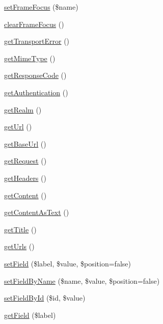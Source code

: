 \begin{DoxyCompactItemize}
\item 
\hyperlink{class_simple_browser_ab7d90a4fb628f576addbec39d1ba26a7}{setFrameFocus} (\$name)
\item 
\hyperlink{class_simple_browser_afe31f064242f5fcc4d00f73088ea6a91}{clearFrameFocus} ()
\item 
\hyperlink{class_simple_browser_aa2141efbbde157cd02e747a149c729db}{getTransportError} ()
\item 
\hyperlink{class_simple_browser_a39e85378a12be207e0b97fd702d9447d}{getMimeType} ()
\item 
\hyperlink{class_simple_browser_acad2d21725cfa0c655104f8e83564c43}{getResponseCode} ()
\item 
\hyperlink{class_simple_browser_a64b60f41bbd36857d8157c30314344fd}{getAuthentication} ()
\item 
\hyperlink{class_simple_browser_a4183d97a5f3b05566c8cad395881c413}{getRealm} ()
\item 
\hyperlink{class_simple_browser_a92cdd5a8dc1a7b29ca064bb3f29ad63d}{getUrl} ()
\item 
\hyperlink{class_simple_browser_ade478f581d42d5c7fafbc62015a8c5b2}{getBaseUrl} ()
\item 
\hyperlink{class_simple_browser_a51cfc002c152bf6d83311b361a5ca10e}{getRequest} ()
\item 
\hyperlink{class_simple_browser_a0bfe8a9c6e52312c54afee681e6871f2}{getHeaders} ()
\item 
\hyperlink{class_simple_browser_acd4adb18386b0d8e001b1dd91ee23dbd}{getContent} ()
\item 
\hyperlink{class_simple_browser_ab303ac172fd3982ad42a939ba78abb5b}{getContentAsText} ()
\item 
\hyperlink{class_simple_browser_a633faed2b21e33e9351f41518285b964}{getTitle} ()
\item 
\hyperlink{class_simple_browser_a876a4e02d4782993282e90aa97c3eabf}{getUrls} ()
\item 
\hyperlink{class_simple_browser_a1abcef538b45e86e5d9b157b0f39234b}{setField} (\$label, \$value, \$position=false)
\item 
\hyperlink{class_simple_browser_aa222b9fee2ab1bef430c1927d8da8b91}{setFieldByName} (\$name, \$value, \$position=false)
\item 
\hyperlink{class_simple_browser_a6ed06235e6bc6f474d9934a6bba33c69}{setFieldById} (\$id, \$value)
\item 
\hyperlink{class_simple_browser_a7ed630487541cc967a26b6491d44173c}{getField} (\$label)
\item 

\end{DoxyCompactItemize}
